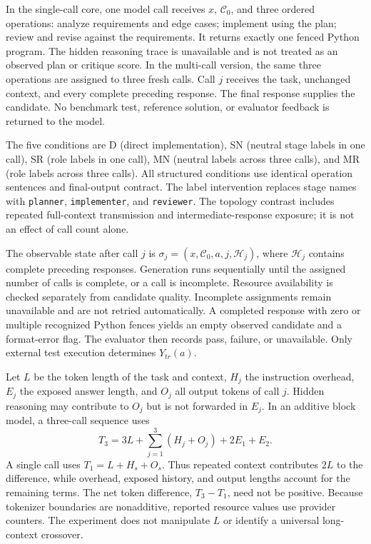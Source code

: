 \documentclass[10pt,letterpaper]{article}
\begin{document}
In the single-call core, one model call receives $x$, $\mathcal{C}_0$, and three ordered operations: analyze requirements and edge cases; implement using the plan; review and revise against the requirements. It returns exactly one fenced Python program. The hidden reasoning trace is unavailable and is not treated as an observed plan or critique score. In the multi-call version, the same three operations are assigned to three fresh calls. Call $j$ receives the task, unchanged context, and every complete preceding response. The final response supplies the candidate. No benchmark test, reference solution, or evaluator feedback is returned to the model.

The five conditions are D (direct implementation), SN (neutral stage labels in one call), SR (role labels in one call), MN (neutral labels across three calls), and MR (role labels across three calls). All structured conditions use identical operation sentences and final-output contract. The label intervention replaces stage names with \texttt{planner}, \texttt{implementer}, and \texttt{reviewer}. The topology contrast includes repeated full-context transmission and intermediate-response exposure; it is not an effect of call count alone.

The observable state after call $j$ is $\sigma_j=(x,\mathcal{C}_0,a,j,\mathcal{H}_j)$, where $\mathcal{H}_j$ contains complete preceding responses. Generation runs sequentially until the assigned number of calls is complete, or a call is incomplete. Resource availability is checked separately from candidate quality. Incomplete assignments remain unavailable and are not retried automatically. A completed response with zero or multiple recognized Python fences yields an empty observed candidate and a format-error flag. The evaluator then records pass, failure, or unavailable. Only external test execution determines $Y_{tr}(a)$.

Let $L$ be the token length of the task and context, $H_j$ the instruction overhead, $E_j$ the exposed answer length, and $O_j$ all output tokens of call $j$. Hidden reasoning may contribute to $O_j$ but is not forwarded in $E_j$. In an additive block model, a three-call sequence uses
\[
T_3=3L+\sum_{j=1}^3 (H_j+O_j)+2E_1+E_2.
\]
A single call uses $T_1=L+H_s+O_s$. Thus repeated context contributes $2L$ to the difference, while overhead, exposed history, and output lengths account for the remaining terms. The net token difference, $T_3-T_1$, need not be positive. Because tokenizer boundaries are nonadditive, reported resource values use provider counters. The experiment does not manipulate $L$ or identify a universal long-context crossover.
\end{document}
